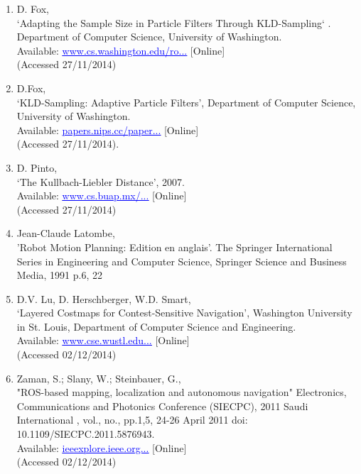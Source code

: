 \documentclass{article}
\begin{document}
\begin{enumerate}
\item D. Fox,
\\‘Adapting the Sample Size in Particle Filters Through KLD-Sampling‘ . Department of Computer Science, University of Washington.
\\Available: \href{www.cs.washington.edu/robotics/mcl/postscripts/adaptive-ijrr-2003.pdf}{\textcolor{blue}{\uline{www.cs.washington.edu/ro...}}} [Online]
\\(Accessed 27/11/2014)

\item D.Fox,
\\‘KLD-Sampling: Adaptive Particle Filters’, Department of Computer Science, University of Washington.
\\Available: \href{papers.nips.cc/paper/1998-kld-sampling-adaptive-particle-filters.pdf}{\textcolor{blue}{\uline{papers.nips.cc/paper...}}} [Online]
\\(Accessed 27/11/2014).

\item D. Pinto,
\\‘The Kullbach-Liebler Distance’, 2007.
\\Available: \href{www.cs.buap.mx/~dpinto/research/CICLing07_1/Pinto06c/node2.html}{\textcolor{blue}{\uline{www.cs.buap.mx/...}}} [Online]
\\(Accessed 27/11/2014)

\item Jean-Claude Latombe,
\\'Robot Motion Planning: Edition en anglais'. The Springer International Series in Engineering and Computer Science, Springer Science and Business Media, 1991 p.6, 22

\item D.V. Lu, D. Herschberger, W.D. Smart,
\\‘Layered Costmaps for Contest-Sensitive Navigation’, Washington University in St. Louis, Department of Computer Science and Engineering.
\\Available: \href{www.cse.wustl.edu/~dvl1/publications/LayeredCostmaps.pdf}{\textcolor{blue}{\uline{www.cse.wustl.edu...}}} [Online]
\\(Accessed 02/12/2014)

\item Zaman, S.; Slany, W.; Steinbauer, G.,
\\"ROS-based mapping, localization and autonomous navigation" Electronics, Communications and Photonics Conference (SIECPC), 2011 Saudi International , vol., no., pp.1,5, 24-26 April 2011 doi: 10.1109/SIECPC.2011.5876943. 
\\Available: \href{ieeexplore.ieee.org/xpls/icp.jsp?arnumber=5876943}{\textcolor{blue}{\uline{ieeexplore.ieee.org...}}} [Online]
\\(Accessed 02/12/2014)


\end{enumerate}
\end{document}
